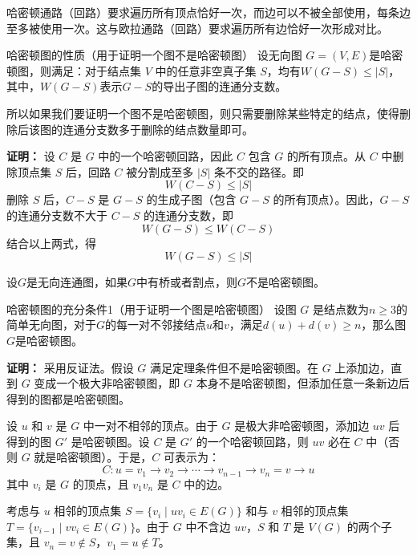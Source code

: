 \documentclass[lang=cn,11pt]{elegantbook}
\begin{document}
哈密顿通路（回路）要求遍历所有顶点恰好一次，而边可以不被全部使用，每条边至多被使用一次。这与欧拉通路（回路）要求遍历所有边恰好一次形成对比。
\begin{theorem}{哈密顿图的性质（用于证明一个图不是哈密顿图）}
    设无向图 $G=(V,E)$是哈密顿图，则满足：对于结点集 $V$ 中的任意非空真子集 $S$，均有$W(G-S)\leqslant |S|$，其中，$W(G-S)$表示$G-S$的导出子图的连通分支数。

    所以如果我们要证明一个图不是哈密顿图，则只需要删除某些特定的结点，使得删除后该图的连通分支数多于删除的结点数量即可。
\end{theorem}
\textbf{证明：}
    设 $C$ 是 $G$ 中的一个哈密顿回路，因此 $C$ 包含 $G$ 的所有顶点。从 $C$ 中删除顶点集 $S$ 后，回路 $C$ 被分割成至多 $|S|$ 条不交的路径。即
    \[
    W(C - S) \leqslant |S|
    \]
删除 $S$ 后，$C - S$ 是 $G - S$ 的生成子图（包含 $G - S$ 的所有顶点）。因此，$G - S$ 的连通分支数不大于 $C - S$ 的连通分支数，即
    \[
    W(G - S) \leqslant W(C - S)
    \]
    结合以上两式，得
    \[
    W(G - S) \leqslant |S|
    \]
\begin{example}[推论]
    设$G$是无向连通图，如果$G$中有桥或者割点，则$G$不是哈密顿图。
\end{example}
\begin{theorem}{哈密顿图的充分条件1（用于证明一个图是哈密顿图）}
设图 $G$ 是结点数为$n\geqslant3$的简单无向图，对于$G$的每一对不邻接结点$u$和$v$，满足$d(u)+d(v)\geqslant n$，那么图$G$是哈密顿图。
\end{theorem}
\textbf{证明：}
采用反证法。假设 $G$ 满足定理条件但不是哈密顿图。在 $G$ 上添加边，直到 $G$ 变成一个极大非哈密顿图，即 $G$ 本身不是哈密顿图，但添加任意一条新边后得到的图都是哈密顿图。

设 $u$ 和 $v$ 是 $G$ 中一对不相邻的顶点。由于 $G$ 是极大非哈密顿图，添加边 $uv$ 后得到的图 $G'$ 是哈密顿图。设 $C$ 是 $G'$ 的一个哈密顿回路，则 $uv$ 必在 $C$ 中（否则 $G$ 就是哈密顿图）。于是，$C$ 可表示为：
\[
C: u = v_1 \to v_2 \to \cdots \to v_{n-1} \to v_n = v \to u
\]
其中 $v_i$ 是 $G$ 的顶点，且 $v_1 v_n$ 是 $C$ 中的边。

考虑与 $u$ 相邻的顶点集 $S = \{v_i \mid uv_{i} \in E(G)\}$ 和与 $v$ 相邻的顶点集 $T = \{v_{i-1} \mid v v_i \in E(G)\}$。由于 $G$ 中不含边 $uv$，$S$ 和 $T$ 是 $V(G)$ 的两个子集，且 $v_n = v \notin S$，$v_1 = u \notin T$。
\end{document}
